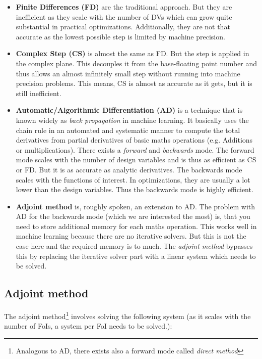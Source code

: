 \begin{itemize}
    \item \textbf{Finite Differences (FD)} are the traditional approach. But
        they are inefficient as they scale with the number of DVs which can
        grow quite substantial in practical optimizations. Additionally, they
        are not that accurate as the lowest possible step is limited by machine
        precision.

    \item \textbf{Complex Step (CS)} is almost the same as FD. But the step is
        applied in the complex plane. This decouples it from the base-floating
        point number and thus allows an almost infinitely small step without
        running into machine precision problems. This means, CS is almost as
        accurate as it gets, but it is still inefficient.

    \item \textbf{Automatic/Algorithmic Differentiation (AD)} is a technique
        that is known widely as \textit{back propagation} in machine learning.
        It basically uses the chain rule in an automated and systematic manner
        to compute the total derivatives from partial derivatives of basic
        maths operations (e.g. Additions or multiplications). There exists a
        \textit{forward} and \textit{backwards} mode. The forward mode scales
        with the number of design variables and is thus as efficient as CS or
        FD. But it is as accurate as analytic derivatives. The backwards mode
        scales with the functions of interest. In optimizations, they are
        usually a lot lower than the design variables. Thus the backwards mode
        is highly efficient.

    \item \textbf{Adjoint method} is, roughly spoken, an extension to AD. The
        problem with AD for the backwards mode (which we are interested the
        most) is, that you need to store additional memory for each maths
        operation. This works well in machine learning because there are no
        iterative solvers. But this is not the case here and the required
        memory is to much. The \textit{adjoint method} bypasses this by
        replacing the iterative solver part with a linear system which
        needs to be solved. 
\end{itemize}




\subsection{Adjoint method}
The adjoint method\footnote{Analogous to AD, there exists also a forward mode
called \textit{direct method}} involves solving the following system (as it
scales with the number of FoIs, a system per FoI needs to be solved.):

